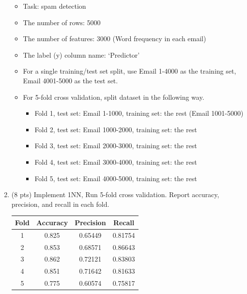 \documentclass[a4paper]{article}
\theoremstyle{definition}
\newenvironment{soln}{
    \leavevmode\color{blue}\ignorespaces
}{}
\begin{document}
\begin{enumerate}
	\begin{itemize}
		\item Task: spam detection
		\item The number of rows: 5000
		\item The number of features: 3000 (Word frequency in each email)
		\item The label (y) column name: `Predictor'
		\item For a single training/test set split, use Email 1-4000 as the training set, Email 4001-5000 as the test set.
		\item For 5-fold cross validation, split dataset in the following way.
		\begin{itemize}
			\item Fold 1, test set: Email 1-1000, training set: the rest (Email 1001-5000)
			\item Fold 2, test set: Email 1000-2000, training set: the rest
			\item Fold 3, test set: Email 2000-3000, training set: the rest
			\item Fold 4, test set: Email 3000-4000, training set: the rest
			\item Fold 5, test set: Email 4000-5000, training set: the rest			
		\end{itemize}
	\end{itemize}
	
	\item (8 pts) Implement 1NN, Run 5-fold cross validation. Report accuracy, precision, and recall in each fold.
	
	\begin{soln}
             \begin{table}[H]
             \begin{soln}
                \begin{center}
                \begin{tabular}{c|c|c|c}
                \hline
                \textbf{Fold} & \textbf{Accuracy} & \textbf{Precision} & \textbf{Recall}\\ \hline
                1 & 0.825 & 0.65449 & 0.81754 \\ 
                2 & 0.853 & 0.68571 & 0.86643 \\ 
                3 & 0.862 & 0.72121 & 0.83803 \\ 
                4 & 0.851 & 0.71642 & 0.81633 \\ 
                5 & 0.775 & 0.60574 & 0.75817 \\ \hline
                \end{tabular}
                \end{center}
            \end{soln}
             \end{table}
        \end{soln}
	

\end{enumerate}
\end{document}
